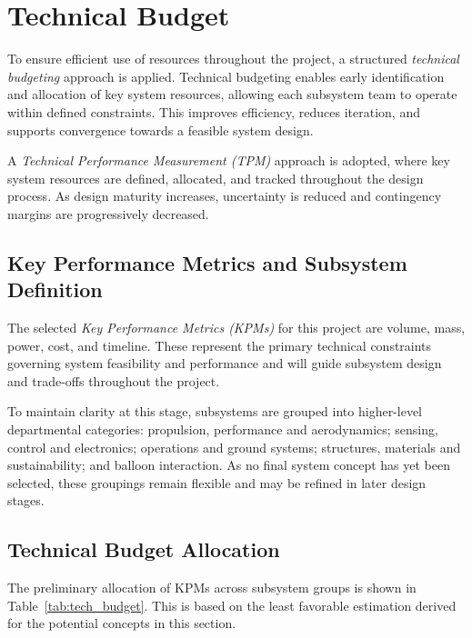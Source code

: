 \chapter{Technical Budget}
\vspace{-10pt}
To ensure efficient use of resources throughout the project, a structured \textit{technical budgeting} approach is applied. Technical budgeting enables early identification and allocation of key system resources, allowing each subsystem team to operate within defined constraints. This improves efficiency, reduces iteration, and supports convergence towards a feasible system design.

A \textit{Technical Performance Measurement (TPM)} approach is adopted, where key system resources are defined, allocated, and tracked throughout the design process. As design maturity increases, uncertainty is reduced and contingency margins are progressively decreased.
\vspace{-15pt}
\section{Key Performance Metrics and Subsystem Definition}

The selected \textit{Key Performance Metrics (KPMs)} for this project are volume, mass, power, cost, and timeline. These represent the primary technical constraints governing system feasibility and performance and will guide subsystem design and trade-offs throughout the project.

To maintain clarity at this stage, subsystems are grouped into higher-level departmental categories: propulsion, performance and aerodynamics; sensing, control and electronics; operations and ground systems; structures, materials and sustainability; and balloon interaction. As no final system concept has yet been selected, these groupings remain flexible and may be refined in later design stages.
\vspace{-15pt}
\section{Technical Budget Allocation}
The preliminary allocation of KPMs across subsystem groups is shown in Table~\ref{tab:tech_budget}. This is based on the least favorable estimation derived for the potential concepts in this section.    
\label{sec: TBA}

